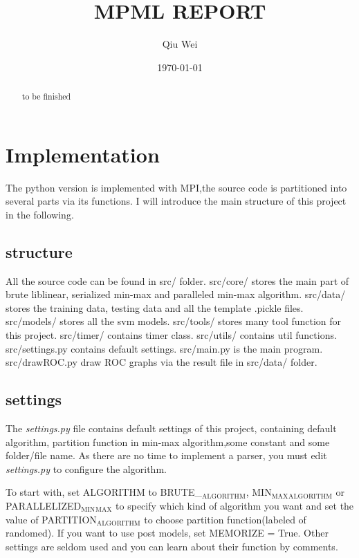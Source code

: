 \documentclass[11pt]{article}
\author{Qiu Wei}
\date{\today}
\title{MPML REPORT}
\begin{document}
\maketitle
\tableofcontents

\begin{abstract}
to be finished
\end{abstract}


\section{Implementation}
\label{sec-1}
The python version is implemented with MPI,the source code is partitioned into several
parts via its functions. I will introduce the main structure of this project in the following.

\subsection{structure}
\label{sec-1-1}
All the source code can be found in src/ folder. src/core/ stores the main part of
brute liblinear, serialized min-max and paralleled min-max algorithm. src/data/ stores
the training data, testing data and all the template .pickle files. src/models/ stores
all the svm models. src/tools/ stores many tool function for this project. src/timer/
contains timer class. src/utils/ contains util functions. src/settings.py contains
default settings. src/main.py is the main program. src/drawROC.py draw ROC graphs
via the result file in src/data/ folder.

\subsection{settings}
\label{sec-1-2}
The \emph{settings.py} file contains default settings of this project, containing default
algorithm, partition function in min-max algorithm,some constant and some folder/file name.
As there are no time to implement a parser, you must edit \emph{settings.py} to configure
the algorithm.

To start with, set ALGORITHM to BRUTE\_$_{\text{ALGORITHM}}$, MIN$_{\text{MAX}}$$_{\text{ALGORITHM}}$ or PARALLELIZED$_{\text{MIN}}$$_{\text{MAX}}$
to specify which kind of algorithm you want and set the value of PARTITION$_{\text{ALGORITHM}}$ to choose
partition function(labeled of randomed). If you want to use post models, set MEMORIZE = True.
Other settings are seldom used and you can learn about their function by comments.
\end{document}
